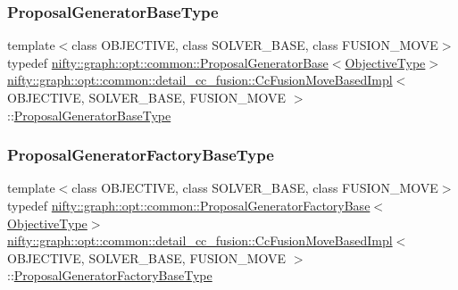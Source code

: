 \subsubsection{\texorpdfstring{Proposal\+Generator\+Base\+Type}{ProposalGeneratorBaseType}}
{\footnotesize\ttfamily template$<$class O\+B\+J\+E\+C\+T\+I\+VE, class S\+O\+L\+V\+E\+R\+\_\+\+B\+A\+SE, class F\+U\+S\+I\+O\+N\+\_\+\+M\+O\+VE$>$ \\
typedef \hyperlink{classnifty_1_1graph_1_1opt_1_1common_1_1ProposalGeneratorBase}{nifty\+::graph\+::opt\+::common\+::\+Proposal\+Generator\+Base}$<$\hyperlink{classnifty_1_1graph_1_1opt_1_1common_1_1detail__cc__fusion_1_1CcFusionMoveBasedImpl_aa9866b5feaad59ab66248cbefc28e6c0}{Objective\+Type}$>$ \hyperlink{classnifty_1_1graph_1_1opt_1_1common_1_1detail__cc__fusion_1_1CcFusionMoveBasedImpl}{nifty\+::graph\+::opt\+::common\+::detail\+\_\+cc\+\_\+fusion\+::\+Cc\+Fusion\+Move\+Based\+Impl}$<$ O\+B\+J\+E\+C\+T\+I\+VE, S\+O\+L\+V\+E\+R\+\_\+\+B\+A\+SE, F\+U\+S\+I\+O\+N\+\_\+\+M\+O\+VE $>$\+::\hyperlink{classnifty_1_1graph_1_1opt_1_1common_1_1detail__cc__fusion_1_1CcFusionMoveBasedImpl_aa8157e2e3df72161d3b767c119b57575}{Proposal\+Generator\+Base\+Type}}

\mbox{\label{classnifty_1_1graph_1_1opt_1_1common_1_1detail__cc__fusion_1_1CcFusionMoveBasedImpl_a5b8c102a697bde14691f87816956af00}} 
\subsubsection{\texorpdfstring{Proposal\+Generator\+Factory\+Base\+Type}{ProposalGeneratorFactoryBaseType}}
{\footnotesize\ttfamily template$<$class O\+B\+J\+E\+C\+T\+I\+VE, class S\+O\+L\+V\+E\+R\+\_\+\+B\+A\+SE, class F\+U\+S\+I\+O\+N\+\_\+\+M\+O\+VE$>$ \\
typedef \hyperlink{classnifty_1_1graph_1_1opt_1_1common_1_1ProposalGeneratorFactoryBase}{nifty\+::graph\+::opt\+::common\+::\+Proposal\+Generator\+Factory\+Base}$<$\hyperlink{classnifty_1_1graph_1_1opt_1_1common_1_1detail__cc__fusion_1_1CcFusionMoveBasedImpl_aa9866b5feaad59ab66248cbefc28e6c0}{Objective\+Type}$>$ \hyperlink{classnifty_1_1graph_1_1opt_1_1common_1_1detail__cc__fusion_1_1CcFusionMoveBasedImpl}{nifty\+::graph\+::opt\+::common\+::detail\+\_\+cc\+\_\+fusion\+::\+Cc\+Fusion\+Move\+Based\+Impl}$<$ O\+B\+J\+E\+C\+T\+I\+VE, S\+O\+L\+V\+E\+R\+\_\+\+B\+A\+SE, F\+U\+S\+I\+O\+N\+\_\+\+M\+O\+VE $>$\+::\hyperlink{classnifty_1_1graph_1_1opt_1_1common_1_1detail__cc__fusion_1_1CcFusionMoveBasedImpl_a5b8c102a697bde14691f87816956af00}{Proposal\+Generator\+Factory\+Base\+Type}}

